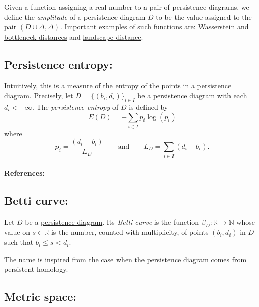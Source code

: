 \documentclass{amsart}
\begin{document}
	Given a function assigning a real number to a pair of persistence diagrams, we define the \textit{amplitude} of a persistence diagram $D$ to be the value assigned to the pair $(D \cup \Delta, \Delta)$. Important examples of such functions are: \hyperref[wasserstein and bottleneck distance]{Wasserstein and bottleneck distances} and \hyperref[persistence landscape norm]{landscape distance}.
	
	\subsection*{Persistence entropy:} \label{persistence entropy}
	
	Intuitively, this is a measure of the entropy of the points in a \hyperref[persistence diagram]{persistence diagram}. Precisely, let $D = \{(b_i, d_i)\}_{i \in I}$ be a persistence diagram with each $d_i < +\infty$. The \textit{persistence entropy} of $D$ is defined by
	\begin{equation*}
	E(D) = - \sum_{i \in I} p_i \log(p_i)
	\end{equation*}
	where
	\begin{equation*}
	p_i = \frac{(d_i - b_i)}{L_D} \qquad \text{and} \qquad L_D = \sum_{i \in I} (d_i - b_i) . 
	\end{equation*}
	
	\paragraph{References:} \cite{rucco2016characterisation}
	
	\subsection*{Betti curve:} \label{betti curve}
	
	Let $D$ be a \hyperref[persistence diagram]{persistence diagram}. Its \textit{Betti curve} is the function $\beta_D : \mathbb R \to \mathbb N$ whose value on $s \in \mathbb R$ is the number, counted with multiplicity, of points $(b_i,d_i)$ in $D$ such that $b_i \leq s <d_i$.
	
	The name is inspired from the case when the persistence diagram comes from persistent homology.
	
	\subsection*{Metric space:} \label{metric space}
	
\end{document}
